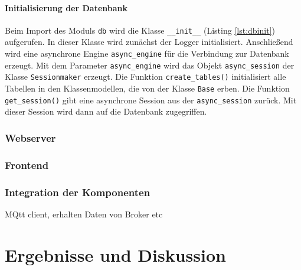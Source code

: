 \documentclass[12pt, letterpaper]{article}
\begin{document}
  \paragraph{Initialisierung der Datenbank}
  \par \textbf{}
  \par Beim Import des Moduls \texttt{db} wird die Klasse \texttt{\_\_init\_\_} (Listing \ref{lst:dbinit}) aufgerufen. In dieser Klasse wird zunächst der Logger initialisiert. Anschließend wird eine asynchrone Engine \texttt{async\_engine} für die Verbindung zur Datenbank erzeugt. Mit dem Parameter \texttt{async\_engine} wird das Objekt \texttt{async\_session} der Klasse \texttt{Sessionmaker} erzeugt. Die Funktion \texttt{create\_tables()} initialisiert alle Tabellen in den Klassenmodellen, die von der Klasse \texttt{Base} erben. Die Funktion \texttt{get\_session()} gibt eine asynchrone Session aus der \texttt{async\_session} zurück. Mit dieser Session wird dann auf die Datenbank zugegriffen.
  \subsubsection{Webserver} 
  \subsubsection{Frontend}
  \subsubsection{Integration der Komponenten}
  \par MQtt client, erhalten Daten von Broker etc

\newpage
\section{Ergebnisse und Diskussion}

\newpage
\end{document}
